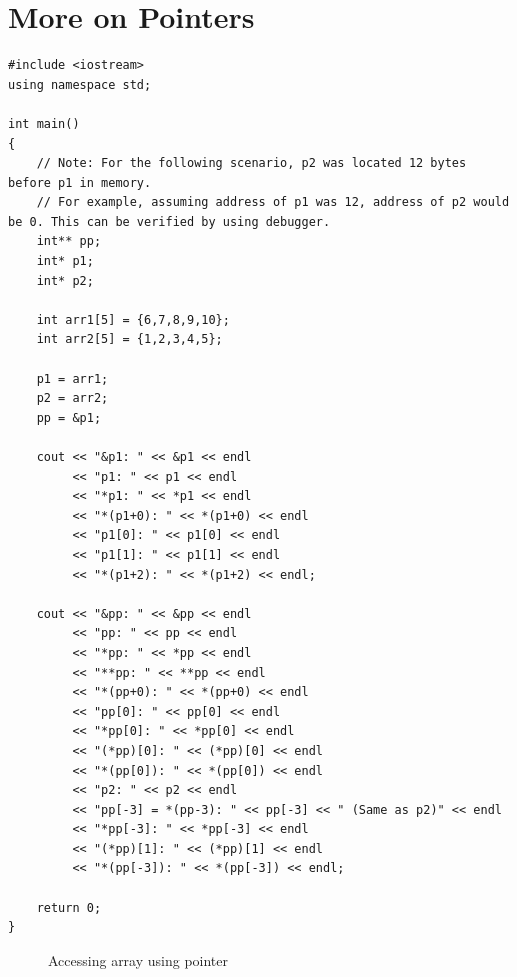 \documentclass[12pt,a4paper]{article}
\begin{document}
\section{More on Pointers}
\begin{lstlisting}[caption={Pointer Example},escapechar=!]
#include <iostream>
using namespace std;

int main()
{
	// Note: For the following scenario, p2 was located 12 bytes before p1 in memory.
	// For example, assuming address of p1 was 12, address of p2 would be 0. This can be verified by using debugger.
	int** pp;
	int* p1;
	int* p2;

	int arr1[5] = {6,7,8,9,10};
	int arr2[5] = {1,2,3,4,5};

	p1 = arr1;
	p2 = arr2;
	pp = &p1;

	cout << "&p1: " << &p1 << endl
		 << "p1: " << p1 << endl
		 << "*p1: " << *p1 << endl
		 << "*(p1+0): " << *(p1+0) << endl
		 << "p1[0]: " << p1[0] << endl
		 << "p1[1]: " << p1[1] << endl
		 << "*(p1+2): " << *(p1+2) << endl;

	cout << "&pp: " << &pp << endl
		 << "pp: " << pp << endl
		 << "*pp: " << *pp << endl
		 << "**pp: " << **pp << endl
		 << "*(pp+0): " << *(pp+0) << endl
		 << "pp[0]: " << pp[0] << endl
		 << "*pp[0]: " << *pp[0] << endl
		 << "(*pp)[0]: " << (*pp)[0] << endl
		 << "*(pp[0]): " << *(pp[0]) << endl
		 << "p2: " << p2 << endl
		 << "pp[-3] = *(pp-3): " << pp[-3] << " (Same as p2)" << endl
		 << "*pp[-3]: " << *pp[-3] << endl
		 << "(*pp)[1]: " << (*pp)[1] << endl
		 << "*(pp[-3]): " << *(pp[-3]) << endl;

	return 0;
}
\end{lstlisting}
\begin{figure}[H]
\centering
{}
\caption{Accessing array using pointer}
\label{Accessing-Array-as-Pointer}
\end{figure}
\end{document}
